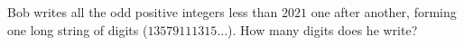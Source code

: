Bob writes all the odd positive integers less than $2021$ one after another, forming one long string of digits ($13579111315\ldots$). How many digits does he write?
